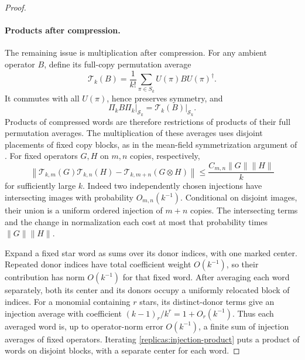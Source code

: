 \begin{proof}
\paragraph{Products after compression.}
The remaining issue is multiplication after compression.  For any
ambient operator $B$, define its full-copy permutation average
\[
 \mathcal T_k(B)=\frac1{k!}\sum_{\pi\in S_k}U(\pi)BU(\pi)^\dagger.
\]
It commutes with all $U(\pi)$, hence preserves symmetry, and
\[
 \Pi_k B\Pi_k\big|_{\mathcal S_k}
   =\mathcal T_k(B)\big|_{\mathcal S_k}.
\]
Products of compressed words are therefore restrictions of products
of their full permutation averages.
The multiplication of these averages uses disjoint placements of fixed
copy blocks, as in the mean-field symmetrization argument of
\cite[Lemma~IV.1]{RaggioWerner1989}.  For fixed operators $G,H$ on
$m,n$ copies, respectively,
\begin{equation}\label{replicas:injection-product}
 \left\|\mathcal T_{k,m}(G)\mathcal T_{k,n}(H)
       -\mathcal T_{k,m+n}(G\otimes H)\right\|
 \le \frac{C_{m,n}\|G\|\|H\|}{k}
\end{equation}
for sufficiently large $k$.  Indeed two independently chosen injections
have intersecting images with probability $O_{m,n}(k^{-1})$.
Conditional on disjoint images, their union is a uniform ordered
injection of $m+n$ copies.  The intersecting terms and the change in
normalization each cost at most that probability times $\|G\|\|H\|$.

Expand a fixed star word as sums over its donor indices, with one
marked center.  Repeated donor indices have total coefficient weight
$O(k^{-1})$, so their contribution has norm $O(k^{-1})$ for that
fixed word.  After averaging each word separately, both its center
and its donors occupy a uniformly relocated block of indices.
For a monomial containing $r$ stars, its distinct-donor terms give
an injection average with coefficient $(k-1)_r/k^r=1+O_r(k^{-1})$.
Thus each averaged word is, up to operator-norm error $O(k^{-1})$,
a finite sum of injection averages of fixed operators.
Iterating \eqref{replicas:injection-product} puts a product of words
on disjoint blocks, with a separate center for each word.


\end{proof}

